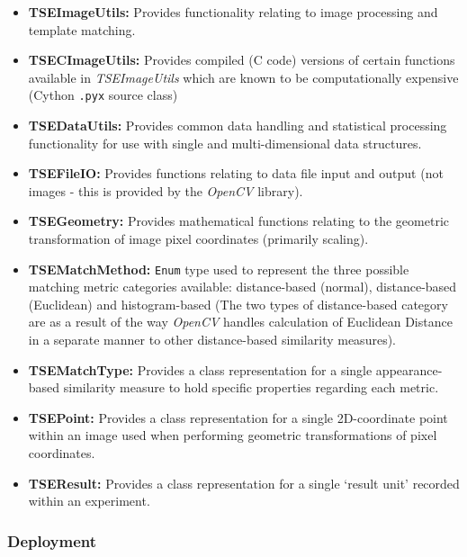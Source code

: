 \begin{itemize}
	\item \textbf{TSEImageUtils:} Provides functionality relating to image processing and template matching.
	\item \textbf{TSECImageUtils:} Provides compiled (C code) versions of certain functions available in \textit{TSEImageUtils} which are known to be computationally expensive (Cython \texttt{.pyx} source class)
	\item \textbf{TSEDataUtils:} Provides common data handling and statistical processing functionality for use with single and multi-dimensional data structures.
	\item \textbf{TSEFileIO:} Provides functions relating to data file input and output (not images - this is provided by the \textit{OpenCV} library).
	\item \textbf{TSEGeometry:} Provides mathematical functions relating to the geometric transformation of image pixel coordinates (primarily scaling).
	\item \textbf{TSEMatchMethod:} \texttt{Enum} type used to represent the three possible matching metric categories available: distance-based (normal), distance-based (Euclidean) and histogram-based (The two types of distance-based category are as a result of the way \textit{OpenCV} handles calculation of Euclidean Distance in a separate manner to other distance-based similarity measures).
	\item \textbf{TSEMatchType:} Provides a class representation for a single appearance-based similarity measure to hold specific properties regarding each metric.
	\item \textbf{TSEPoint:} Provides a class representation for a single 2D-coordinate point within an image used when performing geometric transformations of pixel coordinates.
	\item \textbf{TSEResult:} Provides a class representation for a single `result unit' recorded within an experiment.
\end{itemize}


\subsubsection{Deployment}

